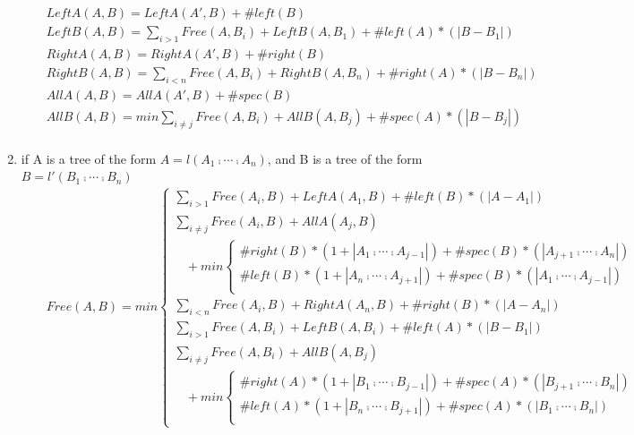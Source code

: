 \begin{theorem}
\begin{enumerate}
\begin{eqnarray*}
&&LeftA(A, B) = LeftA(A', B) + \#left(B)\\
&&LeftB(A, B) = \sum_{i>1}Free(A, B_i) + LeftB(A, B_1) + \#left(A)* (\left\vert B - B_1 \right\vert)\\
&&RightA(A, B) = RightA(A', B) + \#right(B)\\
&&RightB(A, B) = \sum_{i<n}Free(A, B_i) + RightB(A, B_n) + \#right(A) * (\left\vert B - B_n \right\vert)\\
&&AllA(A, B) = AllA(A', B) + \#spec(B)\\
&&AllB(A, B) = min \sum_{i \neq j}Free(A, B_i) + AllB(A, B_j) + \#spec(A) * (\left\vert B - B_j \right\vert)\\	
\end{eqnarray*}
\item if A is a tree of the form $A = l(A_1 \comp \cdots \comp A_n)$, and B is a tree of the form $B = l'(B_1 \comp \cdots \comp B_n)$
\begin{eqnarray*}
&&Free(A, B) = min \begin{cases}
			\sum_{i>1}Free(A_i, B) + LeftA(A_1, B) + \#left(B)*(\left\vert A - A_1 \right\vert) \\
			\sum_{i \neq j}Free(A_i, B) + AllA(A_j, B) \\
			\ \ \ \ + min\begin{cases}
			\#right(B) * (1 + \left\vert A_1 \comp \cdots \comp A_{j-1} \right\vert) + \#spec(B) * (\left\vert A_{j+1} \comp \cdots \comp A_n \right\vert) \\
			\#left(B) * (1 + \left\vert A_n \comp \cdots \comp A_{j+1} \right\vert) + \#spec(B) * (\left\vert A_1 \comp \cdots \comp A_{j-1} \right\vert) \\
			\end{cases}\\
			\sum_{i<n}Free(A_i, B) + RightA(A_n, B) + \#right(B)*(\left\vert A - A_n \right\vert) \\
			\sum_{i>1}Free(A, B_i) + LeftB(A, B_i) + \#left(A)*(\left\vert B - B_1 \right\vert) \\
			\sum_{i \neq j}Free(A, B_i) + AllB(A, B_j) \\
			\ \ \ \ + min\begin{cases}
			\#right(A) * (1 + \left\vert B_1 \comp \cdots \comp B_{j-1} \right\vert) + \#spec(A) * (\left\vert B_{j+1} \comp \cdots \comp B_n \right\vert)\\
			\#left(A) * (1 + \left\vert B_n \comp \cdots \comp B_{j+1} \right\vert) + \#spec(A) * (\left\vert B_1 \comp \cdots \comp B_n \right\vert) \\

\end{cases}
\end{cases}
\end{eqnarray*}
\end{enumerate}
\end{theorem}
